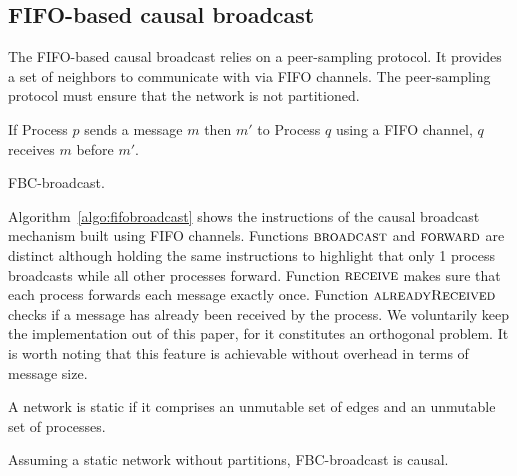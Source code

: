 \subsection{FIFO-based causal broadcast}
\label{subsec:fifobroadcast}

The FIFO-based causal broadcast relies on a peer-sampling protocol. It provides
a set of neighbors to communicate with via FIFO channels. The peer-sampling
protocol must ensure that the network is not partitioned.

\begin{definition}
  If Process $p$ sends a message $m$ then $m'$ to Process $q$ using a FIFO
  channel, $q$ receives $m$ before $m'$.
\end{definition}

\begin{algorithm}[h]
  
  \caption{\label{algo:fifobroadcast}FBC-broadcast.}
\end{algorithm}

Algorithm~\ref{algo:fifobroadcast} shows the instructions of the causal
broadcast mechanism built using FIFO channels. Functions $\textsc{broadcast}$
and $\textsc{forward}$ are distinct although holding the same instructions to
highlight that only 1 process broadcasts while all other processes
forward. Function $\textsc{receive}$ makes sure that each process forwards each
message exactly once. Function $\textsc{alreadyReceived}$ checks if a message
has already been received by the process. We voluntarily keep the implementation
out of this paper, for it constitutes an orthogonal problem. It is worth noting
that this feature is achievable without overhead in terms of message size.

\begin{definition}
  A network is static if it comprises an unmutable set of edges and an unmutable
  set of processes.
\end{definition}


\begin{theorem}
  Assuming a static network without partitions, FBC-broadcast is causal.
\end{theorem}

